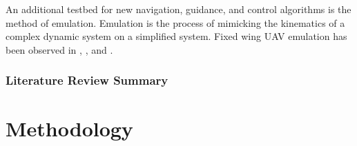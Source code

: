 \documentclass[numbered,pdftex]{ohio-etd}
\begin{document}
An additional testbed for new navigation, guidance, and control algorithms is the method of emulation. Emulation is the process of mimicking the kinematics of a complex dynamic system on a simplified system. Fixed wing UAV emulation has been observed in \cite{louali_designing_2014}, \cite{ren_experimental_2007}, and \cite{louali_experimental_2016}.




\subsection{Literature Review Summary}


\chapter{Methodology}
\end{document}
